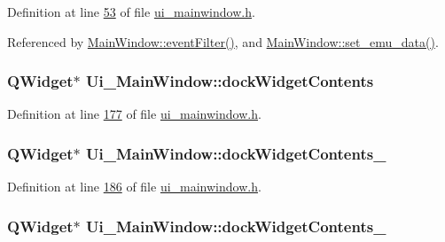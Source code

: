 Definition at line \hyperlink{a00052_source_l00053}{53} of file \hyperlink{a00052_source}{ui\+\_\+mainwindow.\+h}.



Referenced by \hyperlink{a00038_source_l00100}{Main\+Window\+::event\+Filter()}, and \hyperlink{a00047_source_l00606}{Main\+Window\+::set\+\_\+emu\+\_\+data()}.

\hypertarget{a00027_a765ded8236736213d556f6f91941808e}{
\subsubsection[{dock\+Widget\+Contents}]{\setlength{\rightskip}{0pt plus 5cm}Q\+Widget$\ast$ Ui\+\_\+\+Main\+Window\+::dock\+Widget\+Contents}}\label{a00027_a765ded8236736213d556f6f91941808e}


Definition at line \hyperlink{a00052_source_l00177}{177} of file \hyperlink{a00052_source}{ui\+\_\+mainwindow.\+h}.

\hypertarget{a00027_aee633ff4cf1f7b57d7490ac2abf023de}{
\subsubsection[{dock\+Widget\+Contents\+\_\+27}]{\setlength{\rightskip}{0pt plus 5cm}Q\+Widget$\ast$ Ui\+\_\+\+Main\+Window\+::dock\+Widget\+Contents\+\_}}\label{a00027_aee633ff4cf1f7b57d7490ac2abf023de}


Definition at line \hyperlink{a00052_source_l00186}{186} of file \hyperlink{a00052_source}{ui\+\_\+mainwindow.\+h}.

\hypertarget{a00027_a23b450a9debad2b0fecc6f063772caf2}{
\subsubsection[{dock\+Widget\+Contents\+\_\+6}]{\setlength{\rightskip}{0pt plus 5cm}Q\+Widget$\ast$ Ui\+\_\+\+Main\+Window\+::dock\+Widget\+Contents\+\_}}\label{a00027_a23b450a9debad2b0fecc6f063772caf2}


